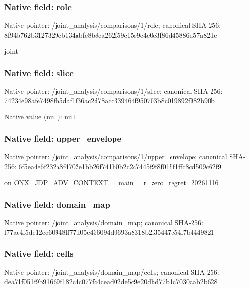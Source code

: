 \documentclass[10pt,a4paper]{article}
\begin{document}
\subsubsection{Native field: role}
Native pointer: /joint\_\allowbreak{}analysis/comparisons/1/role; canonical SHA-256: 8f94b762b3127329eb134abfe8b8ca262f59c15e9c4e0e3f86d45886d57a82de

\begingroup\raggedright\sloppy joint\par\endgroup

\subsubsection{Native field: slice}
Native pointer: /joint\_\allowbreak{}analysis/comparisons/1/slice; canonical SHA-256: 74234e98afe7498fb5daf1f36ac2d78acc339464f950703b8c019892f982b90b

Native value (null): null

\subsubsection{Native field: upper\_\allowbreak{}envelope}
Native pointer: /joint\_\allowbreak{}analysis/comparisons/1/upper\_\allowbreak{}envelope; canonical SHA-256: 6f5ea4e6f232a8f4702e1bb26f741b0b2c2c7445f9f8f015f1ffc8cd509c62f9

\begingroup\raggedright{} on ONX\_\allowbreak{}JDP\_\allowbreak{}ADV\_\allowbreak{}CONTEXT\_\allowbreak{}\_\allowbreak{}main\_\allowbreak{}\_\allowbreak{}r\_\allowbreak{}zero\_\allowbreak{}regret\_\allowbreak{}20261116\par\endgroup

\subsubsection{Native field: domain\_\allowbreak{}map}
Native pointer: /joint\_\allowbreak{}analysis/domain\_\allowbreak{}map; canonical SHA-256: f77ae4f5de12ec60948ff77d05e436094d0693a8318b2f35447c54f7b4449821

\subsubsection{Native field: cells}
Native pointer: /joint\_\allowbreak{}analysis/domain\_\allowbreak{}map/cells; canonical SHA-256: dea71f051f9b91669f182c4c077fc4cead02de5c9e20dbd77b1c7030aab2b628
\end{document}

